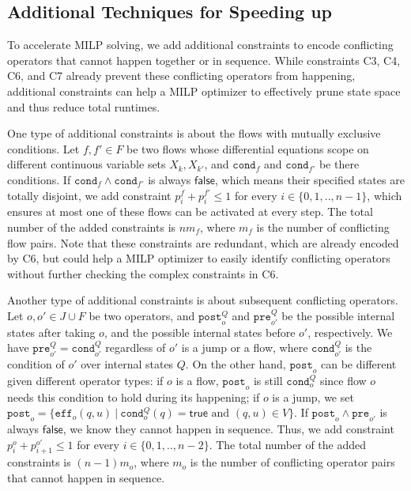 \documentclass[sigconf]{acmart}
\newcommand{\true}{\mathsf{true}}
\newcommand{\false}{\mathsf{false}}
\begin{document}
\subsection{Additional Techniques for Speeding up}
\label{sec:milp:additional}
To accelerate MILP solving, we add additional constraints to encode conflicting operators that cannot happen together or in sequence. While constraints C3, C4, C6, and C7 already prevent these conflicting operators from happening, additional constraints can help a MILP optimizer to effectively prune state space and thus reduce total runtimes.

One type of additional constraints is about the flows with mutually exclusive conditions. Let $f, f' \in F$ be two flows whose differential equations scope on different continuous variable sets $X_k, X_{k'}$, and $\texttt{cond}_f$ and $\texttt{cond}_{f'}$ be there conditions. If $\texttt{cond}_f \land \texttt{cond}_{f'}$ is always $\false$, which means their specified states are totally disjoint, we add constraint $p^f_i + p^{f'}_i  \leq 1$ for every $i \in \{0,1,..,n-1\}$, which ensures at most one of these flows can be activated at every step. The total number of the added constraints is $nm_f$, where $m_f$ is the number of conflicting flow pairs. Note that these constraints are redundant, which are already encoded by C6, but could help a MILP optimizer to easily identify conflicting operators without further checking the complex constraints in C6.

Another type of additional constraints is about subsequent conflicting operators. Let $o, o' \in J \cup F$ be two operators, and $\texttt{post}_o^Q$ and $\texttt{pre}_{o'}^Q$ be the possible internal states after taking $o$, and the possible internal states before $o'$, respectively. We have $\texttt{pre}_{o'}^Q = \texttt{cond}_{o'}^Q$ regardless of $o'$ is a jump or a flow, where $\texttt{cond}_{o'}^Q$ is the condition of $o'$ over internal states $Q$. On the other hand, $\texttt{post}_{o}$ can be different given different operator types: if $o$ is a flow, $\texttt{post}_{o}$ is still $\texttt{cond}_{o}^Q$ since flow $o$ needs this condition to hold during its happening; if $o$ is a jump, we set $\texttt{post}_{o} = \{ \texttt{eff}_o(q,u) \ | \ \texttt{cond}^Q_o(q) = \true \text{ and } (q,u) \in V \}$. If $\texttt{post}_o \land \texttt{pre}_{o'}$ is always $\false$, we know they cannot happen in sequence. Thus, we add constraint $p_i^o + p_{i+1}^{o'} \leq 1$ for every $i \in \{0,1,..,n-2\}$. The total number of the added constraints is $(n-1)m_o$, where $m_o$ is the number of conflicting operator pairs that cannot happen in sequence. 
\end{document}
